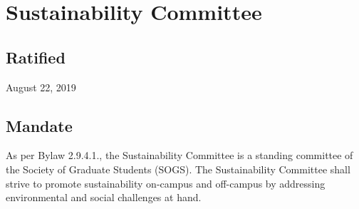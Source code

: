 \section{Sustainability Committee}

\subsection{Ratified}
August 22, 2019

\subsection{Mandate}
As per Bylaw 2.9.4.1., the Sustainability Committee is a standing committee of the Society of Graduate Students (SOGS). The Sustainability Committee shall strive to promote sustainability on-campus and off-campus by addressing environmental and social challenges at hand.

